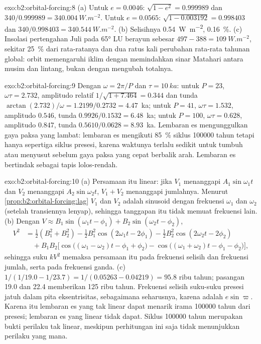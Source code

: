 \begin{solution}{exo:b2:orbital-forcing:8}
(a) Untuk $e = 0.0046$: $\sqrt{1 - e^2} = 0.999989$ dan $340/0.999989 = \qty{340.004}{W.m^{-2}}$. Untuk
$e = 0.0565$: $\sqrt{1 - 0.003192} = 0.998403$ dan $340/0.998403 = \qty{340.544}{W.m^{-2}}$. (b)
Selisihnya \qty{0.54}{W.m^{-2}}, \qty{0.16}{\percent}. (c) Insolasi pertengahan Juli pada \ang{65} LU
berayun sebesar $497 - 388 = \qty{109}{W.m^{-2}}$, sekitar \qty{25}{\percent} dari rata-ratanya dan dua ratus
kali perubahan rata-rata tahunan global: orbit memengaruhi iklim dengan memindahkan sinar Matahari antara
musim dan lintang, bukan dengan mengubah totalnya.
\end{solution}

\begin{solution}{exo:b2:orbital-forcing:9}
Dengan $\omega = 2\pi/P$ dan $\tau = \qty{10}{ka}$: untuk $P = 23$, $\omega\tau = 2.732$, amplitudo
relatif $1/\sqrt{1 + 7.464} = 0.344$ dan tunda $\arctan(2.732)/\omega = 1.2199/0.2732 = 4.47$~ka;
untuk $P = 41$, $\omega\tau = 1.532$, amplitudo $0.546$, tunda $0.9926/0.1532 = 6.48$~ka; untuk $P =
100$, $\omega\tau = 0.628$, amplitudo $0.847$, tunda $0.5610/0.0628 = 8.93$~ka. Lembaran es
mengunggulkan gaya paksa yang lambat: lembaran es mengikuti \qty{85}{\percent} siklus \num{100000} tahun tetapi hanya
sepertiga siklus presesi, karena waktunya terlalu sedikit untuk tumbuh atau menyusut sebelum gaya paksa yang cepat
berbalik arah. Lembaran es bertindak sebagai tapis lolos-rendah.
\end{solution}

\begin{solution}{exo:b2:orbital-forcing:10}
(a) Persamaan itu linear: jika $V_1$ menanggapi $A_1\sin\omega_1t$ dan $V_2$ menanggapi
$A_2\sin\omega_2t$, $V_1 + V_2$ menanggapi jumlahnya. Menurut \cref{prop:b2:orbital-forcing:lag} $V_1$ dan
$V_2$ adalah sinusoid dengan frekuensi $\omega_1$ dan $\omega_2$ (setelah transiennya lenyap), sehingga
tanggapan itu tidak memuat frekuensi lain. (b) Dengan $V \approx B_1\sin(\omega_1t - \phi_1) +
B_2\sin(\omega_2t - \phi_2)$,
\[
\begin{aligned}
  V^2 &= \tfrac12(B_1^2 + B_2^2) - \tfrac12B_1^2\cos(2\omega_1t - 2\phi_1) -
  \tfrac12B_2^2\cos(2\omega_2t - 2\phi_2)\\
  &\quad + B_1B_2\bigl[\cos\bigl((\omega_1 - \omega_2)t - \phi_1 + \phi_2\bigr) -
  \cos\bigl((\omega_1 + \omega_2)t - \phi_1 - \phi_2\bigr)\bigr],
\end{aligned}
\]
sehingga suku $kV^2$ memaksa persamaan itu pada frekuensi selisih dan frekuensi jumlah, serta pada frekuensi
ganda. (c) $1/(1/19.0 - 1/23.7) = 1/(0.05263 - 0.04219) = 95.8$ ribu tahun; pasangan 19.0
dan 22.4 memberikan 125 ribu tahun. Frekuensi selisih suku-suku presesi jatuh dalam pita
eksentrisitas, sebagaimana seharusnya, karena  adalah $e\sin\varpi$. Karena itu lembaran es yang tak linear
dapat menarik irama \num{100000} tahun dari presesi; lembaran es yang linear
tidak dapat. Siklus \num{100000} tahun merupakan bukti perilaku tak linear, meskipun perhitungan ini
saja tidak menunjukkan perilaku yang mana.
\end{solution}


